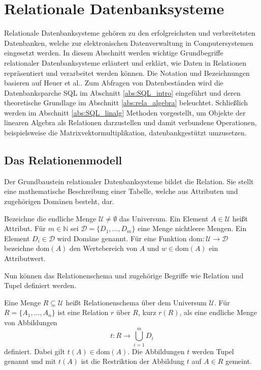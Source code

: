 \section{Relationale Datenbanksysteme}
\label{abs:relation_intro}
Relationale Datenbanksysteme gehören zu den erfolgreichsten und verbreitetsten Datenbanken, welche zur elektronischen Datenverwaltung in Computersystemen eingesetzt werden. In diesem Abschnitt werden wichtige Grundbegriffe relationaler Datenbanksysteme erläutert und erklärt, wie Daten in Relationen repräsentiert und verarbeitet werden können. Die Notation und Bezeichnungen basieren auf Heuer et al.\cite{DBLP:books/daglib/0044627}. Zum Abfragen von Datenbeständen wird die Datenbanksparche SQL im Abschnitt \ref{abs:SQL_intro} eingeführt und deren theoretische Grundlage im Abschnitt \ref{abs:rela_algebra} beleuchtet. Schließlich werden im Abschnitt \ref{abs:SQL_linalg} Methoden vorgestellt, um Objekte der linearen Algebra als Relationen darzustellen und damit verbundene Operationen, beispielsweise die Matrixvektormultiplikation, datenbankgestützt umzusetzen.

\subsection{Das Relationenmodell}
Der Grundbaustein relationaler Datenbanksysteme bildet die Relation. Sie stellt eine mathematische Beschreibung einer Tabelle, welche aus Attributen und zugehörigen Domänen besteht, dar.

\begin{defi}
    \label{def:universum}
    Bezeichne die endliche Menge $\mathcal{U} \neq \emptyset$ das Universum. Ein Element $A \in \mathcal{U}$ heißt Attribut. Für $m \in \mathbb{N}$ sei $\mathcal{D}=\{D_1, \ldots, D_m\}$ eine Menge nichtleere Mengen. Ein Element $D_i \in \mathcal{D}$ wird Domäne genannt. Für eine Funktion $\mathrm{dom}: \mathcal{U} \rightarrow \mathcal{D}$ bezeichne $\mathrm{dom}(A)$ den Wertebereich von $A$ und $w \in \mathrm{dom}(A)$ ein Attributwert.
\end{defi}

Nun können das Relationenschema und zugehörige Begriffe wie Relation und Tupel definiert werden.

\begin{defi}
    \label{def:relation}
    Eine Menge $R \subseteq \mathcal{U}$ heißt Relationenschema über dem Universum $\mathcal{U}$. Für $R=\{A_1, \ldots, A_n \}$ ist eine Relation $r$ über $R$, kurz $r(R)$, als eine endliche Menge von Abbildungen
    \begin{equation*}
        t:R \rightarrow \bigcup_{i=1}^m D_i
    \end{equation*}
    definiert. Dabei gilt $t(A) \in \mathrm{dom}(A)$. Die Abbildungen $t$ werden Tupel genannt und mit $t(A)$ ist die Restriktion der Abbildung $t$ auf $A \in R$ gemeint.
\end{defi}

